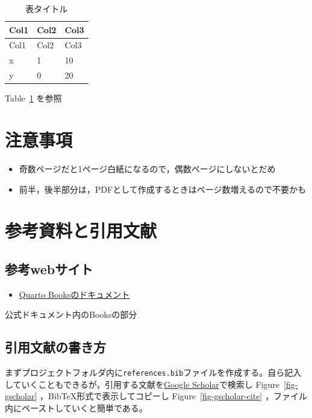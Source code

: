 \documentclass[
  b5paper,
  xelatex, ja=standard]{bxjsbook}
\providecommand{\tightlist}{%
  \setlength{\itemsep}{0pt}\setlength{\parskip}{0pt}}\usepackage{longtable,booktabs,array}
\begin{document}
\begin{longtable}[]{@{}lll@{}}
\caption{表タイトル}\label{tbl-hyo}\tabularnewline
\toprule\noalign{}
Col1 & Col2 & Col3 \\
\midrule\noalign{}
\endfirsthead
\toprule\noalign{}
Col1 & Col2 & Col3 \\
\midrule\noalign{}
\endhead
\bottomrule\noalign{}
\endlastfoot
x & 1 & 10 \\
y & 0 & 20 \\
\end{longtable}

Table~\ref{tbl-hyo} を参照


\chapter{注意事項}\label{sec-caution}

\begin{itemize}
\tightlist
\item
  奇数ページだと1ページ白紙になるので，偶数ページにしないとだめ
\item
  前半，後半部分は，PDFとして作成するときはページ数増えるので不要かも
\end{itemize}


\chapter{参考資料と引用文献}\label{sec-sanko}

\section{参考webサイト}\label{ux53c2ux8003webux30b5ux30a4ux30c8}

\begin{itemize}
\tightlist
\item
  \href{https://quarto.org/docs/books/}{Quarto Booksのドキュメント}
\end{itemize}

公式ドキュメント内のBooksの部分

\section{引用文献の書き方}\label{ux5f15ux7528ux6587ux732eux306eux66f8ux304dux65b9}

まずプロジェクトフォルダ内に\texttt{references.bib}ファイルを作成する。自ら記入していくこともできるが，引用する文献を\href{https://scholar.google.com/}{Google
Scholar}で検索し Figure~\ref{fig-gscholar}
，BibTeX形式で表示してコピーし Figure~\ref{fig-gscholar-cite}
，ファイル内にペーストしていくと簡単である。
\end{document}
